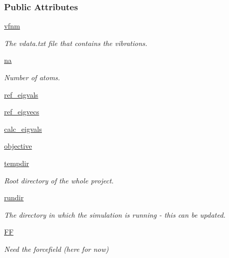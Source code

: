 \subsubsection*{Public Attributes}
\begin{DoxyCompactItemize}
\item 
\hyperlink{classforcebalance_1_1vibration_1_1Vibration_a50552dbdadc7a86aaab97bfdcf85e449}{vfnm}
\begin{DoxyCompactList}\small\item\em The vdata.\-txt file that contains the vibrations. \end{DoxyCompactList}\item 
\hyperlink{classforcebalance_1_1vibration_1_1Vibration_a31148c4d3157dddf2485c4e63496e120}{na}
\begin{DoxyCompactList}\small\item\em Number of atoms. \end{DoxyCompactList}\item 
\hyperlink{classforcebalance_1_1vibration_1_1Vibration_ab9913cb05e66e53a5781237baf9ea2e1}{ref\-\_\-eigvals}
\item 
\hyperlink{classforcebalance_1_1vibration_1_1Vibration_ae9c5479bd3b01ecb3d2d40a9487ccac5}{ref\-\_\-eigvecs}
\item 
\hyperlink{classforcebalance_1_1vibration_1_1Vibration_a465150971ac24aabbf40b1f50b304f6e}{calc\-\_\-eigvals}
\item 
\hyperlink{classforcebalance_1_1vibration_1_1Vibration_a78813cc16da8d8c6a8113e3301c96c0d}{objective}
\item 
\hyperlink{classforcebalance_1_1target_1_1Target_aa1f01b5b78db253b5b66384ed11ed193}{tempdir}
\begin{DoxyCompactList}\small\item\em Root directory of the whole project. \end{DoxyCompactList}\item 
\hyperlink{classforcebalance_1_1target_1_1Target_a6872de5b2d4273b82336ea5b0da29c9e}{rundir}
\begin{DoxyCompactList}\small\item\em The directory in which the simulation is running -\/ this can be updated. \end{DoxyCompactList}\item 
\hyperlink{classforcebalance_1_1target_1_1Target_a38a37919783141ea37fdcf8b00ce0aaf}{F\-F}
\begin{DoxyCompactList}\small\item\em Need the forcefield (here for now) \end{DoxyCompactList}\item 

\end{DoxyCompactItemize}
